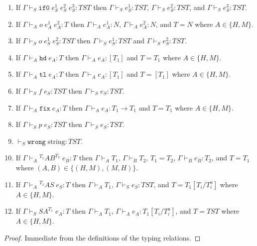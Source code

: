 \begin{lemma}
\begin{enumerate}
\item If $\Gamma\vdash_{S}\mathtt{if0}\;e_{S}^{1}\;e_{S}^{2}\;e_{S}^{3}:TST$ then $\Gamma\vdash_{S}e_{S}^{1}:TST$, $\Gamma\vdash_{S}e_{S}^{2}:TST$, and $\Gamma\vdash_{S}e_{S}^{3}:TST$.
\item If $\Gamma\vdash_{A}o\;e_{A}^{1}\;e_{A}^{2}:T$ then $\Gamma\vdash_{A}e_{A}^{1}:N$, $\Gamma\vdash_{A}e_{A}^{2}:N$, and $T=N$ where $A\in\lbrace H,M\rbrace$.
\item If $\Gamma\vdash_{S}o\;e_{S}^{1}\;e_{S}^{2}:TST$ then $\Gamma\vdash_{S}e_{S}^{1}:TST$ and $\Gamma\vdash_{S}e_{S}^{2}:TST$.
\item If $\Gamma\vdash_{A}\mathtt{hd}\;e_{A}:T$ then $\Gamma\vdash_{A}e_{A}:[T_{1}]$ and $T=T_{1}$ where $A\in\lbrace H,M\rbrace$.
\item If $\Gamma\vdash_{A}\mathtt{tl}\;e_{A}:T$ then $\Gamma\vdash_{A}e_{A}:[T_{1}]$ and $T=[T_{1}]$ where $A\in\lbrace H,M\rbrace$.
\item If $\Gamma\vdash_{S}f\;e_{S}:TST$ then $\Gamma\vdash_{S}e_{S}:TST$.
\item If $\Gamma\vdash_{A}\mathtt{fix}\;e_{A}:T$ then $\Gamma\vdash_{A}e_{A}:T_{1}\rightarrow T_{1}$ and $T=T_{1}$ where $A\in\lbrace H,M\rbrace$.
\item If $\Gamma\vdash_{S}p\;e_{S}:TST$ then $\Gamma\vdash_{S}e_{S}:TST$.
\item $\vdash_{S}\mathtt{wrong}\;\mathrm{string}:TST$.
\item If $\Gamma\vdash_{A}{^{T_{1}}A}B^{T_{2}}\;e_{B}:T$ then $\Gamma\vdash_{A}T_{1}$, $\Gamma\vdash_{B}T_{2}$, $T_{1}=T_{2}$, $\Gamma\vdash_{B}e_{B}:T_{2}$, and $T=T_{1}$ where $(A,B)\in\lbrace(H,M),(M,H)\rbrace$.
\item If $\Gamma\vdash_{A}{^{T_{1}}A}S\;e_{S}:T$ then $\Gamma\vdash_{A}T_{1}$, $\Gamma\vdash_{S}e_{S}:TST$, and $T=T_{1}[T_{i}/T_{i}^{a}]$ where $A\in\lbrace H,M\rbrace$.
\item If $\Gamma\vdash_{S}SA^{T_{1}}\;e_{A}:T$ then $\Gamma\vdash_{A}T_{1}$, $\Gamma\vdash_{A}e_{A}:T_{1}[T_{i}/T_{i}^{a}]$, and $T=TST$ where $A\in\lbrace H,M\rbrace$.
\end{enumerate}
\begin{proof}
Immediate from the definitions of the typing relations.
\end{proof}
\end{lemma}